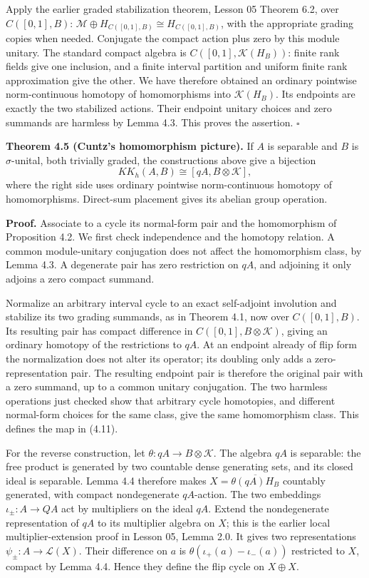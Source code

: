 \documentclass[
  11pt,
]{article}
\begin{document}
Apply the earlier graded stabilization theorem, Lesson 05 Theorem 6.2,
over \(C([0,1],B)\):
\(\mathcal M\oplus H_{C([0,1],B)}\cong H_{C([0,1],B)}\), with the
appropriate grading copies when needed. Conjugate the compact action
plus zero by this module unitary. The standard compact algebra is
\(C([0,1],\mathcal K(H_B))\): finite rank fields give one inclusion, and
a finite interval partition and uniform finite rank approximation give
the other. We have therefore obtained an ordinary pointwise
norm-continuous homotopy of homomorphisms into \(\mathcal K(H_B)\). Its
endpoints are exactly the two stabilized actions. Their endpoint unitary
choices and zero summands are harmless by Lemma 4.3. This proves the
assertion. \(\square\)

\textbf{Theorem 4.5 (Cuntz's homomorphism picture).} If \(A\) is
separable and \(B\) is \(\sigma\)-unital, both trivially graded, the
constructions above give a bijection \[
KK_h(A,B)\cong[qA,B\otimes\mathcal K],
\tag{4.11}
\] where the right side uses ordinary pointwise norm-continuous homotopy
of homomorphisms. Direct-sum placement gives its abelian group
operation.

\textbf{Proof.} Associate to a cycle its normal-form pair and the
homomorphism of Proposition 4.2. We first check independence and the
homotopy relation. A common module-unitary conjugation does not affect
the homomorphism class, by Lemma 4.3. A degenerate pair has zero
restriction on \(qA\), and adjoining it only adjoins a zero compact
summand.

Normalize an arbitrary interval cycle to an exact self-adjoint
involution and stabilize its two grading summands, as in Theorem 4.1,
now over \(C([0,1],B)\). Its resulting pair has compact difference in
\(C([0,1],B\otimes\mathcal K)\), giving an ordinary homotopy of the
restrictions to \(qA\). At an endpoint already of flip form the
normalization does not alter its operator; its doubling only adds a
zero-representation pair. The resulting endpoint pair is therefore the
original pair with a zero summand, up to a common unitary conjugation.
The two harmless operations just checked show that arbitrary cycle
homotopies, and different normal-form choices for the same class, give
the same homomorphism class. This defines the map in (4.11).

For the reverse construction, let \(\theta:qA\to B\otimes\mathcal K\).
The algebra \(qA\) is separable: the free product is generated by two
countable dense generating sets, and its closed ideal is separable.
Lemma 4.4 therefore makes \(X=\overline{\theta(qA)H_B}\) countably
generated, with compact nondegenerate \(qA\)-action. The two embeddings
\(\iota_\pm:A\to QA\) act by multipliers on the ideal \(qA\). Extend the
nondegenerate representation of \(qA\) to its multiplier algebra on
\(X\); this is the earlier local multiplier-extension proof in Lesson
05, Lemma 2.0. It gives two representations
\(\psi_\pm:A\to\mathcal L(X)\). Their difference on \(a\) is
\(\theta(\iota_+(a)-\iota_-(a))\) restricted to \(X\), compact by Lemma
4.4. Hence they define the flip cycle on \(X\oplus X\).
\end{document}
